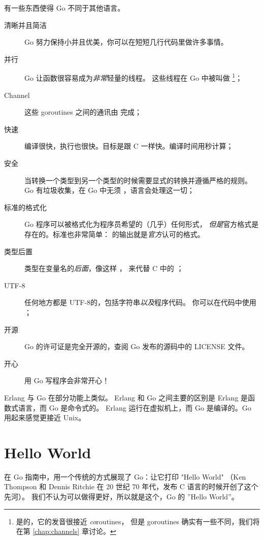 \noindent{}有一些东西使得 Go 不同于其他语言。
\begin{description}
\item[清晰并且简洁]
Go 努力保持小并且优美，你可以在短短几行代码里做许多事情。

\item[并行]
Go 让函数很容易成为\emph{非常}轻量的线程。
这些线程在 Go 中被叫做  
\footnote{是的，它的发音很接近 \emph{co}routines，
但是 goroutines 确实有一些不同，我们将在第 \ref{chap:channels} 章讨论。}；

\item[Channel]
这些 goroutines 之间的通讯由
 \cite{csp, hoare} 完成；

\item[快速]
编译很快，执行也很快。目标是跟 C 一样快。编译时间用秒计算；

\item[安全]
当转换一个类型到另一个类型的时候需要显式的转换并遵循严格的规则。
Go 有垃圾收集，在 Go 中无须 ，语言会处理这一切；

\item[标准的格式化]
Go 程序可以被格式化为程序员希望的（几乎）任何形式，
\emph{但是}官方格式是存在的。标准也非常简单：
 的输出就是\emph{官方}认可的格式。

\item[类型后置]
类型在变量名的\emph{后面}，像这样 ，
来代替 C 中的 ；

\item[UTF-8]
任何地方都是 UTF-8的，包括字符串\emph{以及}程序代码。 
你可以在代码中使用 ；

\item[开源]
Go 的许可证是完全开源的，查阅 Go 发布的源码中的 LICENSE 文件。

\item[开心]
用 Go 写程序会非常开心！

\end{description}
Erlang \cite{erlang} 与 Go 在部分功能上类似。
Erlang 和 Go 之间主要的区别是 Erlang 是函数式语言，而 Go 是命令式的。
Erlang 运行在虚拟机上，而 Go 是编译的。Go 用起来感觉更接近 Unix。

\section{Hello World}
\label{sec:hello world}
在 Go 指南中，用一个传统的方式展现了 Go：让它打印 "Hello World"
（Ken Thompson 和 Dennis Ritchie 在 20 世纪 70 年代，发布 C 语言的时候开创了这个先河）。
我们不认为可以做得更好，所以就是这个，Go 的 ''Hello World''。


